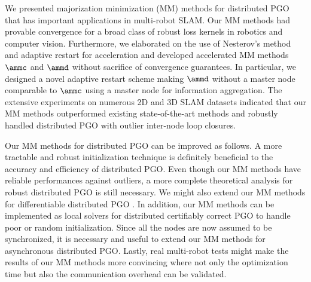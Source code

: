 We presented majorization minimization (MM) methods for distributed PGO that has important applications in multi-robot SLAM. Our MM methods had provable convergence for a broad class of robust loss kernels in robotics and computer vision. Furthermore, we elaborated on the use of Nesterov's method and adaptive restart for acceleration and developed accelerated MM methods $\ammc$ and $\ammd$ without sacrifice of convergence guarantees. In particular, we designed a novel adaptive restart scheme making  $\ammd$  without a master node comparable to  $\ammc$  using a master node for information aggregation. The extensive experiments on numerous 2D and 3D SLAM datasets indicated that our MM methods outperformed existing state-of-the-art methods and  robustly handled distributed PGO with outlier inter-node loop closures.

Our MM methods for distributed PGO can be improved as  follows.  A more tractable and robust initialization technique is definitely beneficial to the accuracy and efficiency of distributed PGO. Even though our MM methods have  reliable performances against outliers, a more complete theoretical analysis for robust distributed PGO is still necessary. We might also extend our MM methods for differentiable distributed PGO \cite{pineda2022theseus}.  In addition, our MM methods can be implemented as local solvers for distributed certifiably correct PGO \cite{tian2019distributed}  to handle poor or random initialization. Since all the nodes are now assumed to be synchronized, it is necessary and useful to extend our MM methods for asynchronous distributed PGO. {\highlight Lastly, real multi-robot tests might make the results of our MM methods more convincing where not only the optimization time but also the communication overhead can be validated.}

